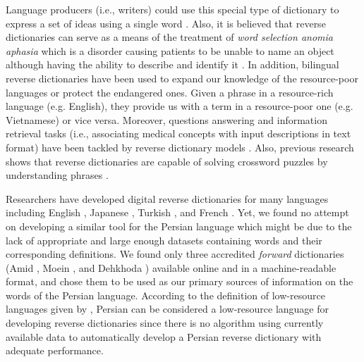 \documentclass{article}
\begin{document}
Language producers (i.e., writers) could use this special type of dictionary to express a set of ideas using a single word \citep{calvo2016integrated}.
Also, it is believed that reverse dictionaries can serve as a means of the treatment of \textit{word selection anomia aphasia} \citep{rohrer2008word} which is a disorder causing patients to be unable to name an object although having the ability to describe and identify it \citep{thorat2016implementing}.
In addition, bilingual reverse dictionaries \citep{lam2013creating} have been used to expand our knowledge of the resource-poor languages or protect the endangered ones. Given a phrase in a resource-rich language (e.g. English), they provide us with a term in a resource-poor one (e.g. Vietnamese) or vice versa. 
Moreover, questions answering and information retrieval tasks (i.e., associating medical concepts with input descriptions in text format) have been tackled by reverse dictionary models \citep{kartsaklis2018mapping}.
Also, previous research shows that reverse dictionaries are capable of solving crossword puzzles by understanding phrases  \citep{hill2016learning}. 


Researchers have developed digital reverse dictionaries for many languages including English \citep{zock2004word}, Japanese \citep{bilac2004dictionary}, Turkish \citep{el2004use}, and French \citep{dutoit2002lexical}. Yet, we found no attempt on developing a similar tool for the Persian language which might be due to the lack of appropriate and large enough datasets containing words and their corresponding definitions. We found only three accredited \textit{forward} dictionaries (Amid \citep{amid}, Moein \citep{moin}, and Dehkhoda \citep{dehkhoda}) available online and in a machine-readable format, and chose them to be used as our primary sources of information on the words of the Persian language. According to the definition of low-resource languages given by \citet{duong2017natural}, Persian can be considered a low-resource language for developing reverse dictionaries since there is no algorithm using currently available data to automatically develop a Persian reverse dictionary with adequate performance.

\end{document}
